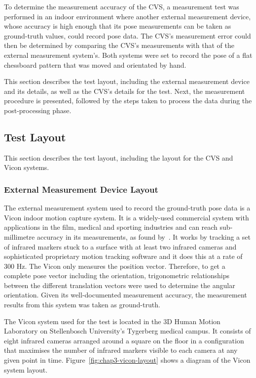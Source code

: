To determine the measurement accuracy of the CVS, a measurement test was performed in an indoor environment where another external measurement device, whose accuracy is high enough that its pose measurements can be taken as ground-truth values, could record pose data. The CVS's measurement error could then be determined by comparing the CVS's measurements with that of the external measurement system's. Both systems were set to record the pose of a flat chessboard pattern that was moved and orientated by hand.

This section describes the test layout, including the external measurement device and its details, as well as the CVS's details for the test. Next, the measurement procedure is presented, followed by the steps taken to process the data during the post-processing phase. 

\subsection{Test Layout}
\label{sec:vicon-test-setup}

This section describes the test layout, including the layout for the CVS and Vicon systems. 

\subsubsection{External Measurement Device Layout}

The external measurement system used to record the ground-truth pose data is a Vicon indoor motion capture system. It is a widely-used commercial system with applications in the film, medical and sporting industries and can reach sub-millimetre accuracy in its measurements, as found by~\cite{windolf2008systematic}. It works by tracking a set of infrared markers stuck to a surface with at least two infrared cameras and sophisticated proprietary motion tracking software and it does this at a rate of 300 Hz. The Vicon only measures the position vector. Therefore, to get a complete pose vector including the orientation, trigonometric relationships between the different translation vectors were used to determine the angular orientation. Given its well-documented measurement accuracy, the measurement results from this system was taken as ground-truth.

The Vicon system used for the test is located in the 3D Human Motion Laboratory on Stellenbosch University's Tygerberg medical campus. It consists of eight infrared cameras arranged around a square on the floor in a configuration that maximises the number of infrared markers visible to each camera at any given point in time. Figure~\ref{fig:chap3-vicon-layout} shows a diagram of the Vicon system layout. 
 
